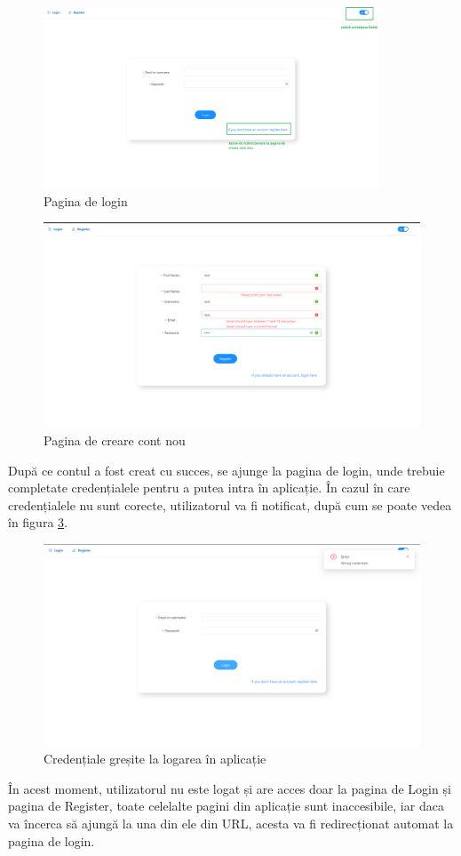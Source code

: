 \begin{figure}[ht]
	\centering
	\includegraphics[width=100mm]{figs/loginPage.png}
    \caption{Pagina de login}
	\label{fig:loginPage}
\end{figure}

\begin{figure}[ht]
	\centering
	\includegraphics[width=150mm]{figs/createAccount.png}
    \caption{Pagina de creare cont nou}
	\label{fig:createAccount}
\end{figure}

După ce contul a fost creat cu succes, se ajunge la pagina de login, unde trebuie completate credențialele pentru a putea intra în aplicație. 
În cazul în care credențialele nu sunt corecte, utilizatorul va fi notificat, după cum se poate vedea în figura \ref{fig:wrongCredentialsLogin}. 
\begin{figure}[H]
	\centering
	\includegraphics[width=150mm]{figs/wrongCredentialsLogin.png}
    \caption{Credențiale greșite la logarea în aplicație}
	\label{fig:wrongCredentialsLogin}
\end{figure}
În acest moment, utilizatorul nu este logat și are acces doar la pagina de Login și pagina de Register, toate celelalte pagini din aplicație sunt inaccesibile, iar daca va încerca să ajungă la una din ele din URL, 
acesta va fi redirecționat automat la pagina de login. 

